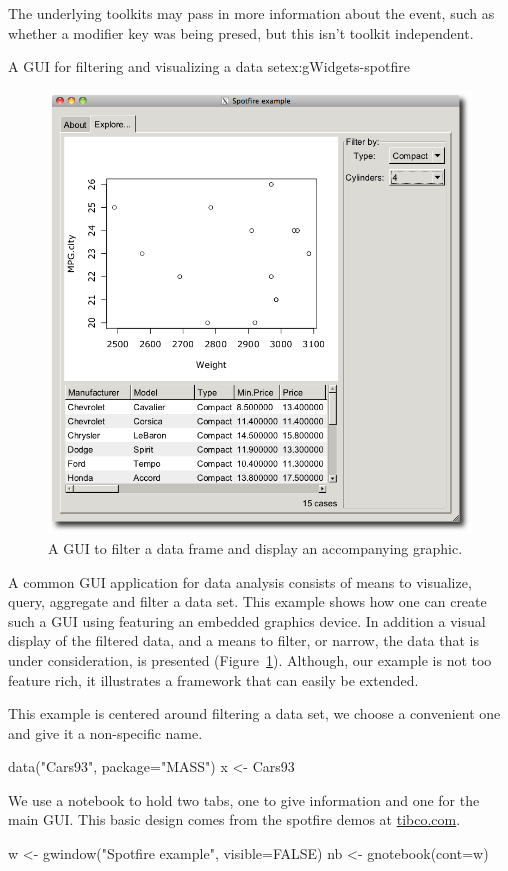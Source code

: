 The underlying toolkits may pass in more information about the event,
such as whether a modifier key was being presed, but this isn't
toolkit independent.


\begin{example}{A GUI for filtering and visualizing a data set}{ex:gWidgets-spotfire}

\begin{figure}
  \centering
  \includegraphics[width=.6\textwidth]{fig-gWidgets-spotfire-gui}
  \caption{A GUI to filter a data frame and display an accompanying graphic.}
  \label{fig:gWidgets-spotfire-gui}
\end{figure}
A common GUI application for data analysis consists of means to
visualize, query, aggregate and filter a data set. This example shows
how one can create such a GUI using  featuring an
embedded graphics device. In addition a visual display of the filtered
data, and a means to filter, or narrow, the data that is under
consideration, is presented (Figure~\ref{fig:gWidgets-spotfire-gui}).
Although, our example is not too feature rich, it illustrates a
framework that can easily be extended.


This example is centered around filtering a data set, we choose a
convenient one and give it a non-specific name.
\begin{Schunk}
\begin{Sinput}
 data("Cars93", package="MASS")
 x <- Cars93
\end{Sinput}
\end{Schunk}

We use a notebook to hold two tabs, one to give information and one
for the main GUI. This basic design comes from the spotfire demos at \url{tibco.com}.
\begin{Schunk}
\begin{Sinput}
 w <- gwindow("Spotfire example", visible=FALSE)
 nb <- gnotebook(cont=w)
\end{Sinput}
\end{Schunk}



\end{example}
